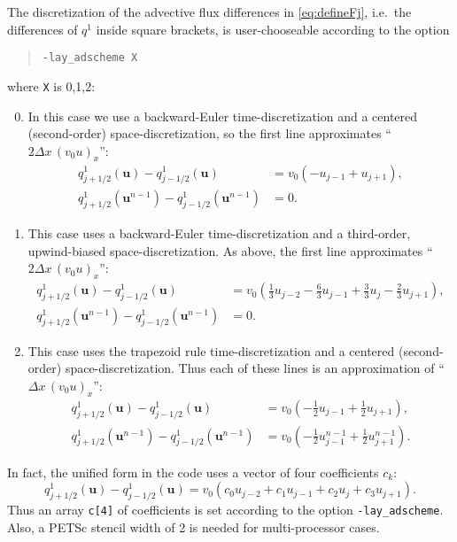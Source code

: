 \documentclass[11pt]{amsart}
\newcommand\bu{\mathbf{u}}
\begin{document}
The discretization of the advective flux differences in \eqref{eq:defineFj}, i.e.~the differences of $q^1$ inside square brackets, is user-chooseable according to the option
\begin{quote}
\verb|-lay_adscheme X|
\end{quote}
where \verb|X| is 0,1,2:
\medskip
\renewcommand{\labelenumi}{\texttt{X}$=$\arabic{enumi}: \quad}
\begin{enumerate}
\setcounter{enumi}{-1}
\item %
In this case we use a backward-Euler time-discretization and a centered (second-order) space-discretization, so the first line approximates ``$2 \Delta x\,(v_0 u)_x$'':
\begin{align*}
q^1_{j+1/2}(\bu) - q^1_{j-1/2}(\bu)             &= v_0 \left( - u_{j-1} + u_{j+1} \right), \\
q^1_{j+1/2}(\bu^{n-1}) - q^1_{j-1/2}(\bu^{n-1}) &= 0.
\end{align*}
\item %
This case uses a backward-Euler time-discretization and a third-order, upwind-biased space-discretization.  As above, the first line approximates ``$2 \Delta x\,(v_0 u)_x$'':
\begin{align*}
q^1_{j+1/2}(\bu) - q^1_{j-1/2}(\bu)             &= v_0 \left( \tfrac{1}{3} u_{j-2} - \tfrac{6}{3} u_{j-1} + \tfrac{3}{3} u_j - \tfrac{2}{3} u_{j+1} \right), \\
q^1_{j+1/2}(\bu^{n-1}) - q^1_{j-1/2}(\bu^{n-1}) &= 0.
\end{align*}
\item %
This case uses the trapezoid rule time-discretization and a centered (second-order) space-discretization.  Thus each of these lines is an approximation of ``$\Delta x\,(v_0 u)_x$'':
\begin{align*}
q^1_{j+1/2}(\bu) - q^1_{j-1/2}(\bu)             &= v_0 \left( - \tfrac{1}{2} u_{j-1} + \tfrac{1}{2} u_{j+1} \right), \\
q^1_{j+1/2}(\bu^{n-1}) - q^1_{j-1/2}(\bu^{n-1}) &= v_0 \left( - \tfrac{1}{2} u_{j-1}^{n-1} + \tfrac{1}{2} u_{j+1}^{n-1} \right).
\end{align*}
\end{enumerate}

\medskip
In fact, the unified form in the code uses a vector of four coefficients $c_k$:
\begin{equation}
   q^1_{j+1/2}(\bu) - q^1_{j-1/2}(\bu) = v_0 \left( c_0 u_{j-2} + c_1 u_{j-1} + c_2 u_j + c_3 u_{j+1} \right). \label{eq:dfluxunified}
\end{equation}
Thus an array \verb|c[4]| of coefficients is set according to the option \verb|-lay_adscheme|.  Also, a PETSc stencil width of 2 is needed for multi-processor cases.
\end{document}
